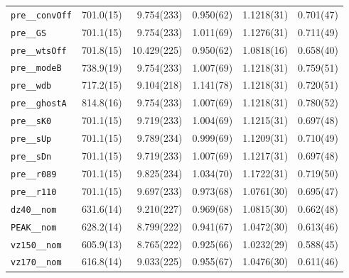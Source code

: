 \begin{tabular}{lrrrrr}
\texttt{pre\_\_convOff} & 701.0(15) & 9.754(233) & 0.950(62) & 1.1218(31) & 0.701(47) \\
\texttt{pre\_\_GS} & 701.1(15) & 9.754(233) & 1.011(69) & 1.1276(31) & 0.711(49) \\
\texttt{pre\_\_wtsOff} & 701.8(15) & 10.429(225) & 0.950(62) & 1.0818(16) & 0.658(40) \\
\texttt{pre\_\_modeB} & 738.9(19) & 9.754(233) & 1.007(69) & 1.1218(31) & 0.759(51) \\
\texttt{pre\_\_wdb} & 717.2(15) & 9.104(218) & 1.141(78) & 1.1218(31) & 0.720(51) \\
\texttt{pre\_\_ghostA} & 814.8(16) & 9.754(233) & 1.007(69) & 1.1218(31) & 0.780(52) \\
\texttt{pre\_\_sK0} & 701.1(15) & 9.719(233) & 1.004(69) & 1.1215(31) & 0.697(48) \\
\texttt{pre\_\_sUp} & 701.1(15) & 9.789(234) & 0.999(69) & 1.1209(31) & 0.710(49) \\
\texttt{pre\_\_sDn} & 701.1(15) & 9.719(233) & 1.007(69) & 1.1217(31) & 0.697(48) \\
\texttt{pre\_\_r089} & 701.1(15) & 9.825(234) & 1.034(70) & 1.1722(31) & 0.719(50) \\
\texttt{pre\_\_r110} & 701.1(15) & 9.697(233) & 0.973(68) & 1.0761(30) & 0.695(47) \\
\texttt{dz40\_\_nom} & 631.6(14) & 9.210(227) & 0.969(68) & 1.0815(30) & 0.662(48) \\
\texttt{PEAK\_\_nom} & 628.2(14) & 8.799(222) & 0.941(67) & 1.0472(30) & 0.613(46) \\
\texttt{vz150\_\_nom} & 605.9(13) & 8.765(222) & 0.925(66) & 1.0232(29) & 0.588(45) \\
\texttt{vz170\_\_nom} & 616.8(14) & 9.033(225) & 0.955(67) & 1.0476(30) & 0.611(46) \\
\bottomrule
\end{tabular}
